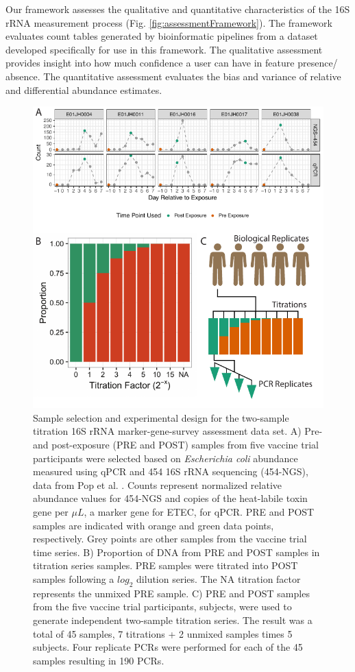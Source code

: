 \documentclass{bmcart}
\begin{document}
Our framework assesses the qualitative and quantitative characteristics of the 16S rRNA measurement process (Fig. \ref{fig:assessmentFramework}).
The framework evaluates count tables generated by bioinformatic pipelines from a dataset developed specifically for use in this framework.
The qualitative assessment provides insight into how much confidence a user can have in feature  presence/ absence.
The quantitative assessment evaluates the bias and variance of relative and differential abundance estimates.

\begin{figure}
\centering
\includegraphics{experimentalDesign.pdf}
\caption{\label{fig:countExperimentalDesign}Sample selection and
experimental design for the two-sample titration 16S rRNA
marker-gene-survey assessment data set. A) Pre- and post-exposure (PRE
and POST) samples from five vaccine trial participants were selected
based on \textit{Escherichia coli} abundance measured using qPCR and 454
16S rRNA sequencing (454-NGS), data from Pop et al. \cite{pop2016individual}.
Counts represent normalized relative abundance values for 454-NGS and
copies of the heat-labile toxin gene per \(\mu L\), a marker gene for
ETEC, for qPCR. PRE and POST samples are indicated with orange and green
data points, respectively. Grey points are other samples from the
vaccine trial time series. B) Proportion of DNA from PRE and POST
samples in titration series samples. PRE samples were titrated into POST
samples following a \(log_2\) dilution series. The NA titration factor
represents the unmixed PRE sample. C) PRE and POST samples from the five
vaccine trial participants, subjects, were used to generate independent
two-sample titration series. The result was a total of 45 samples, 7
titrations + 2 unmixed samples times 5 subjects. Four replicate PCRs
were performed for each of the 45 samples resulting in 190 PCRs.}
\end{figure}
\end{document}
